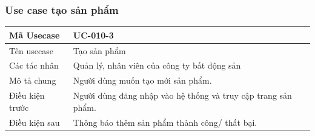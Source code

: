 \documentclass[12pt,a4paper]{article}
\begin{document}
    \subsubsection*{Use case tạo sản phẩm}
    \begin{table}[H]
        \centering
        \begin{tabular}{|p{3.5cm}|p{11.5cm}|c|}
            \hline
            Mã Usecase      & UC-010-3                                                      \\
            \hline
            Tên usecase     & Tạo sản phẩm                                                  \\
            \hline
            Các tác nhân    & Quản lý, nhân viên của công ty bất động sản                   \\
            \hline
            Mô tả chung     & Người dùng muốn tạo mới sản phẩm.                             \\
            \hline

            Điều kiện trước & Người dùng đăng nhập vào hệ thống và truy cập trang sản phẩm. \\
            \hline

            Điều kiện sau   & Thông báo thêm sản phẩm thành công/ thất bại.                 \\
            \hline


\end{tabular}
\end{table}
\end{document}
